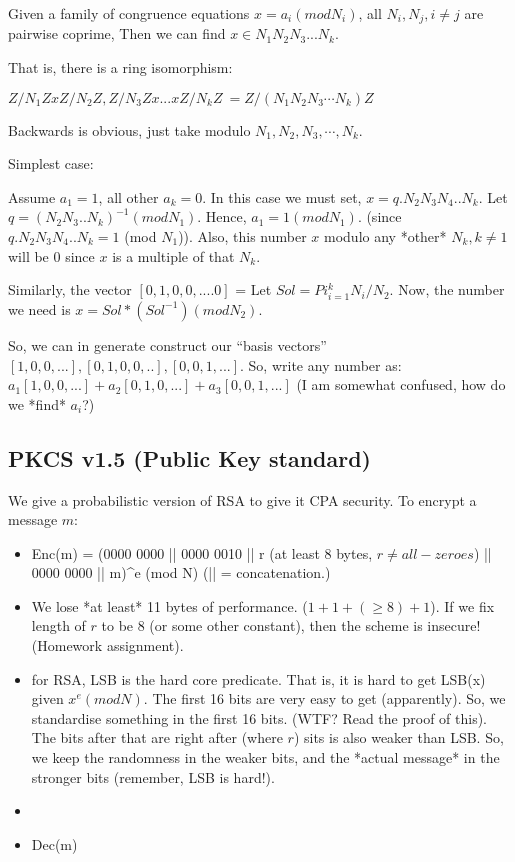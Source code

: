 
Given a family of congruence equations $x = a_i (mod N_i)$, all $N_i, N_j, i \neq j$ are pairwise coprime,
Then we can find $x \in N_1N_2N_3...N_k$.

That is, there is a ring isomorphism:

$Z/N_1Z x Z/N_2Z, Z/N_3Z x ... x Z/N_kZ ~= Z/(N_1N_2N_3 \cdots N_k)Z$

Backwards is obvious, just take modulo $N_1, N_2, N_3, \cdots, N_k$.

Simplest case:

Assume $a_1 = 1$, all other $a_k = 0$. In this case we must set, $x = q.N_2N_3N_4..N_k$.
Let $q = (N_2N_3..N_k)^{-1} (mod N_1)$. Hence, $a_1 = 1 (mod N_1)$. (since $q.N_2N_3N_4..N_k = 1$ (mod $N_1$)).
Also, this number $x$ modulo any *other* $N_k, k \neq 1$ will be $0$ since $x$ is a multiple of that $N_k$.

Similarly, the vector
$[0, 1, 0, 0, ....0]$ = Let  $ Sol= Pi_{i = 1}^k N_i / N_2$. Now, the number we need is $x = Sol*(Sol^{-1}) (mod N_2)$.

So, we can in generate construct our ``basis vectors'' $[1, 0, 0, ...], [0, 1, 0, 0, ..], [0, 0, 1, ...]$.
So, write any number as:
$a_1 [1, 0, 0, ...] + a_2 [0, 1, 0, ...] + a_3 [0, 0, 1, ...]$ (I am somewhat confused, how do we *find* $a_i$?)


\subsection{PKCS v1.5 (Public Key standard)}
We give a probabilistic version of RSA to give it CPA security. To encrypt a message $m$:

\begin{itemize}
\item Enc(m) = (0000 0000 || 0000 0010 || r (at least 8 bytes, $r \neq all-zeroes$) || 0000 0000 || m)^e (mod N) (|| = concatenation.)
\item We lose *at least* 11 bytes of performance. ($1 + 1 + (\geq 8) + 1$). If we fix length of $r$ to be $8$ (or some other constant),
  then the scheme is insecure! (Homework assignment).
\item for RSA, LSB is the hard core predicate. That is, it is hard to get LSB(x) given $x^e (mod N)$. The first 16 bits are very easy to get (apparently).
  So, we standardise something in the first 16 bits. (WTF? Read the proof of this). The bits after that are right after (where $r$) sits is
  also weaker than LSB. So, we keep the randomness in the weaker bits, and the *actual message* in the stronger bits (remember, LSB is hard!).
\item 
\item Dec(m)
\end{itemize}

